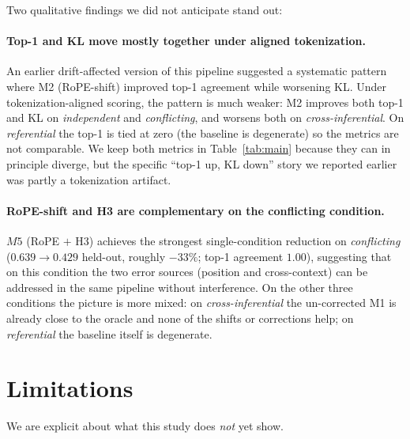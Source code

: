 Two qualitative findings we did not anticipate stand out:

\paragraph{Top-1 and KL move mostly together under aligned tokenization.} An earlier drift-affected version of this pipeline suggested a systematic pattern where M2 (RoPE-shift) improved top-1 agreement while worsening KL. Under tokenization-aligned scoring, the pattern is much weaker: M2 improves both top-1 and KL on \emph{independent} and \emph{conflicting}, and worsens both on \emph{cross-inferential}. On \emph{referential} the top-1 is tied at zero (the baseline is degenerate) so the metrics are not comparable. We keep both metrics in Table~\ref{tab:main} because they can in principle diverge, but the specific ``top-1 up, KL down'' story we reported earlier was partly a tokenization artifact.

\paragraph{RoPE-shift and H3 are complementary on the conflicting condition.} $M5$ (RoPE $+$ H3) achieves the strongest single-condition reduction on \emph{conflicting} ($0.639 \to 0.429$ held-out, roughly $-33\%$; top-1 agreement $1.00$), suggesting that on this condition the two error sources (position and cross-context) can be addressed in the same pipeline without interference. On the other three conditions the picture is more mixed: on \emph{cross-inferential} the un-corrected M1 is already close to the oracle and none of the shifts or corrections help; on \emph{referential} the baseline itself is degenerate.

\section{Limitations}

We are explicit about what this study does \emph{not} yet show.

